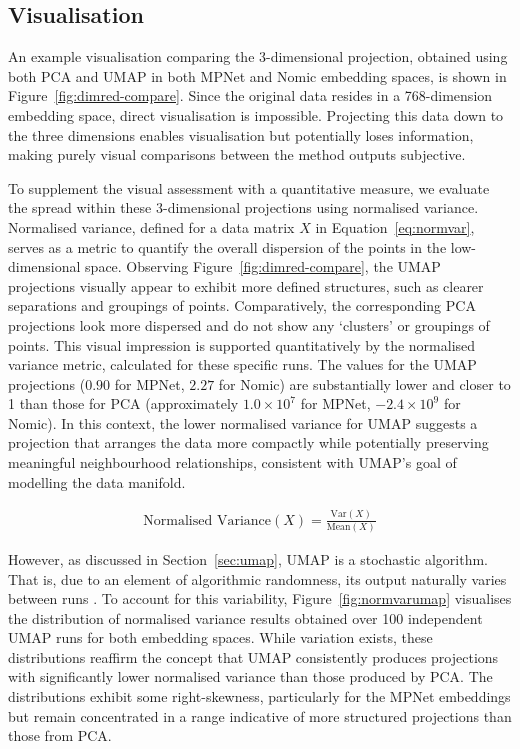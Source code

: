 \documentclass[10pt,oneside]{report}
\begin{document}
\subsection{Visualisation}

An example visualisation comparing the 3-dimensional projection, obtained using both PCA and UMAP in both MPNet and Nomic embedding spaces, is shown in Figure~\ref{fig:dimred-compare}. Since the original data resides in a 768-dimension embedding space, direct visualisation is impossible. Projecting this data down to the three dimensions enables visualisation but potentially loses information, making purely visual comparisons between the method outputs subjective.

To supplement the visual assessment with a quantitative measure, we evaluate the spread within these 3-dimensional projections using normalised variance. Normalised variance, defined for a data matrix $X$ in Equation~\ref{eq:normvar}, serves as a metric to quantify the overall dispersion of the points in the low-dimensional space.
Observing Figure~\ref{fig:dimred-compare}, the UMAP projections visually appear to exhibit more defined structures, such as clearer separations and groupings of points. Comparatively, the corresponding PCA projections look more dispersed and do not show any `clusters' or groupings of points. This visual impression is supported quantitatively by the normalised variance metric, calculated for these specific runs. The values for the UMAP projections ($0.90$ for MPNet, $2.27$ for Nomic) are substantially lower and closer to 1 than those for PCA (approximately $1.0 \times 10^7$ for MPNet, $-2.4 \times 10^9$ for Nomic). In this context, the lower normalised variance for UMAP suggests a projection that arranges the data more compactly while potentially preserving meaningful neighbourhood relationships, consistent with UMAP's goal of modelling the data manifold.

\begin{align}
    \text{Normalised Variance}(X) = \frac{\text{Var}(X)}{\text{Mean}(X)}
    \label{eq:normvar}
\end{align}

However, as discussed in Section~\ref{sec:umap}, UMAP is a stochastic algorithm. That is, due to an element of algorithmic randomness, its output naturally varies between runs \cite{mcinnes2018umap}. To account for this variability, Figure~\ref{fig:normvarumap} visualises the distribution of normalised variance results obtained over 100 independent UMAP runs for both embedding spaces. While variation exists, these distributions reaffirm the concept that UMAP consistently produces projections with significantly lower normalised variance than those produced by PCA. The distributions exhibit some right-skewness, particularly for the MPNet embeddings but remain concentrated in a range indicative of more structured projections than those from PCA.
\end{document}
